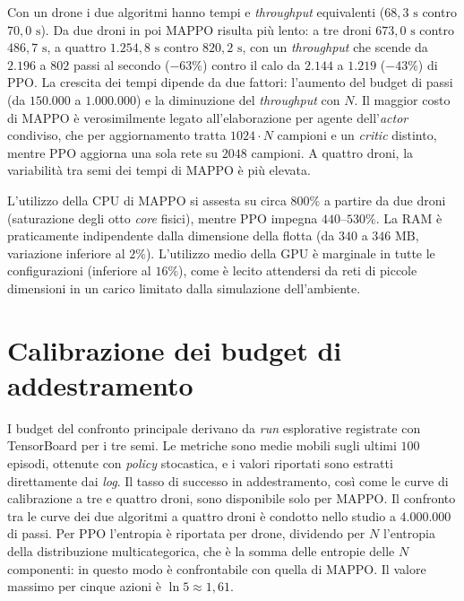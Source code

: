 \documentclass[12pt,a4paper,twoside]{report}
\begin{document}
Con un drone i due algoritmi hanno tempi e \emph{throughput} equivalenti ($68,3\text{ s}$ contro $70,0\text{ s}$). Da due droni in poi MAPPO risulta più lento: a tre droni $673,0\text{ s}$ contro $486,7\text{ s}$, a quattro $1.254,8\text{ s}$ contro $820,2\text{ s}$, con un \emph{throughput} che scende da $2.196$ a $802$ passi al secondo ($-63\%$) contro il calo da $2.144$ a $1.219$ ($-43\%$) di PPO. La crescita dei tempi dipende da due fattori: l'aumento del budget di passi (da $150.000$ a $1.000.000$) e la diminuzione del \emph{throughput} con $N$. Il maggior costo di MAPPO è verosimilmente legato all'elaborazione per agente dell'\emph{actor} condiviso, che per aggiornamento tratta $1024 \cdot N$ campioni e un \emph{critic} distinto, mentre PPO aggiorna una sola rete su $2048$ campioni. A quattro droni, la variabilità tra semi dei tempi di MAPPO è più elevata.

L'utilizzo della CPU di MAPPO si assesta su circa $800\%$ a partire da due droni (saturazione degli otto \emph{core} fisici), mentre PPO impegna $440$--$530\%$. La RAM è praticamente indipendente dalla dimensione della flotta (da $340$ a $346\text{ MB}$, variazione inferiore al $2\%$). L'utilizzo medio della GPU è marginale in tutte le configurazioni (inferiore al $16\%$), come è lecito attendersi da reti di piccole dimensioni in un carico limitato dalla simulazione dell'ambiente.

\section{Calibrazione dei budget di addestramento}
\label{sec:calibrazione_budget}

I budget del confronto principale derivano da \emph{run} esplorative registrate con TensorBoard per i tre semi. Le metriche sono medie mobili sugli ultimi $100$ episodi, ottenute con \emph{policy} stocastica, e i valori riportati sono estratti direttamente dai \emph{log}. Il tasso di successo in addestramento, così come le curve di calibrazione a tre e quattro droni, sono disponibile solo per MAPPO. Il confronto tra le curve dei due algoritmi a quattro droni è condotto nello studio a $4.000.000$ di passi. Per PPO l'entropia è riportata per drone, dividendo per $N$ l'entropia della distribuzione multicategorica, che è la somma delle entropie delle $N$ componenti: in questo modo è confrontabile con quella di MAPPO. Il valore massimo per cinque azioni è $\ln 5 \approx 1,61$.
\newpage
\end{document}
